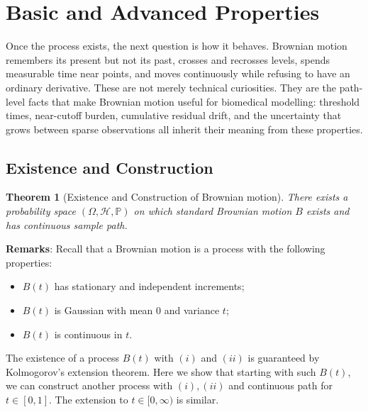 \documentclass{article}
\theoremstyle{plain}
\newtheorem{theorem}{Theorem}
\theoremstyle{definition}
\begin{document}
\section{Basic and Advanced Properties}

Once the process exists, the next question is how it behaves. Brownian
motion remembers its present but not its past, crosses and recrosses
levels, spends measurable time near points, and moves continuously while
refusing to have an ordinary derivative. These are not merely technical
curiosities. They are the path-level facts that make Brownian motion useful
for biomedical modelling: threshold times, near-cutoff burden, cumulative
residual drift, and the uncertainty that grows between sparse observations
all inherit their meaning from these properties.

\subsection{Existence and Construction}
\begin{theorem}[Existence and Construction of Brownian motion]\label{thm:exist}
There exists a probability space $(\Omega,\mathcal{H},\mathbb{P})$ on which standard Brownian motion $B$ exists and has continuous sample path.
\end{theorem}

\textbf{Remarks}: Recall that a Brownian motion is a process with the following properties:
\begin{itemize}
    \item[(i)] $B(t)$ has stationary and independent increments;
    \item[(ii)] $B(t)$ is Gaussian with mean $0$ and variance $t$;
    \item[(iii)] $B(t)$ is continuous in $t$.
\end{itemize}
The existence of a process $B(t)$ with $(i)$ and $(ii)$ is guaranteed by Kolmogorov's extension theorem. Here we show that starting with such $B(t)$, we can construct another process with $(i),(ii)$ and continuous path for $t\in[0,1]$. The extension to $t\in[0,\infty)$ is similar.
\end{document}
